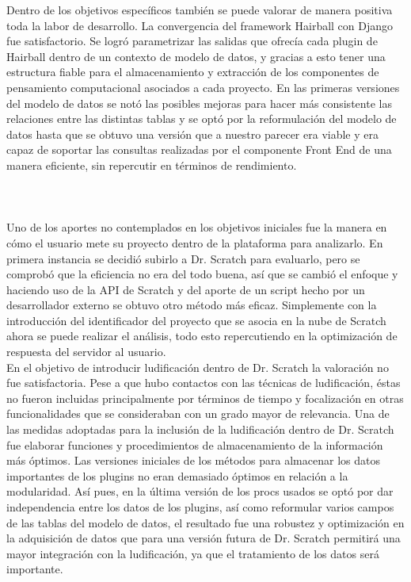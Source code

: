 \documentclass[a4paper, 12pt]{book}
\begin{document}
Dentro de los objetivos específicos también se puede valorar de manera
positiva toda la labor de desarrollo. La convergencia del framework
Hairball con Django fue satisfactorio. Se logró parametrizar las salidas
que ofrecía cada plugin de Hairball dentro de un contexto de modelo de
datos, y gracias a esto tener una estructura fiable para el almacenamiento
y extracción de los componentes de pensamiento computacional asociados
a cada proyecto. En las primeras versiones del modelo de datos se notó
las posibles mejoras para hacer más consistente las relaciones entre las
distintas tablas y se optó por la reformulación del modelo de datos hasta
que se obtuvo una versión que a nuestro parecer era viable y era capaz
de soportar las consultas realizadas por el componente Front End de una
manera eficiente, sin repercutir en términos de rendimiento. \\ \\ \\ \\

Uno de los aportes no contemplados en los objetivos iniciales fue la
manera en cómo el usuario mete su proyecto dentro de la plataforma
para analizarlo. En primera instancia se decidió subirlo a Dr. Scratch
para evaluarlo, pero se comprobó que la eficiencia no era del todo
buena, así que se cambió el enfoque y haciendo uso de la API de Scratch
y del aporte de un script hecho por un desarrollador externo se 
obtuvo otro método más eficaz. Simplemente con la introducción del 
identificador del proyecto que se asocia en la nube de Scratch ahora
se puede realizar el análisis, todo esto repercutiendo en la optimización 
de respuesta del servidor al usuario. \\

En el objetivo de introducir ludificación dentro de Dr. Scratch la 
valoración no fue satisfactoria. Pese a que hubo contactos con las 
técnicas de ludificación, éstas no fueron incluidas principalmente 
por términos de tiempo y focalización en otras funcionalidades que 
se consideraban con un grado mayor de relevancia. Una de las medidas
adoptadas para la inclusión de la ludificación dentro de Dr. Scratch
fue elaborar funciones y procedimientos de almacenamiento de la 
información más óptimos. Las versiones iniciales de los métodos para 
almacenar los datos importantes de los plugins no eran demasiado 
óptimos en relación a la modularidad. Así pues, en la última versión
de los procs usados se optó por dar independencia entre los datos de 
los plugins, así como reformular varios campos de las tablas del
modelo de datos, el resultado fue una robustez y optimización en la
adquisición de datos que para una versión futura de Dr. Scratch 
permitirá una mayor integración con la ludificación, ya que el 
tratamiento de los datos será importante. \\ \\
\end{document}
